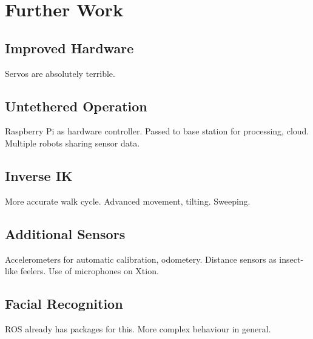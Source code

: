 \chapter{Further Work}


\section{Improved Hardware}
Servos are absolutely terrible.

\section{Untethered Operation}
Raspberry Pi as hardware controller. Passed to base station for processing, cloud. Multiple robots sharing sensor data.

\section{Inverse IK}
More accurate walk cycle. Advanced movement, tilting. Sweeping.

\section{Additional Sensors}
Accelerometers for automatic calibration, odometery. Distance sensors as insect-like feelers. Use of microphones on Xtion.  

\section{Facial Recognition}
ROS already has packages for this. More complex behaviour in general.